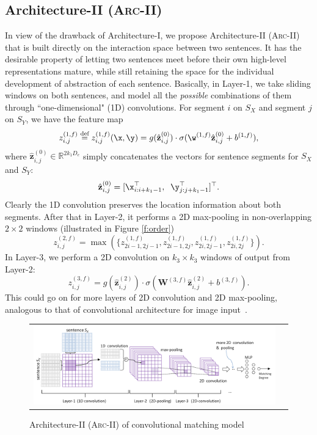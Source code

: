 \documentclass{article} %
\begin{document}
\subsection{Architecture-II (\textsc{Arc-II})}  \vspace{-10pt}
In view of the drawback of Architecture-I, we propose Architecture-II (\textsc{Arc-II}) that is built directly on the interaction space between two sentences. It has the desirable property of letting two sentences meet before their own high-level representations mature, while still retaining the space for the individual development of abstraction of each sentence. Basically, in Layer-1, we take sliding windows on both sentences, and model all the \emph{possible} combinations of them through ``one-dimensional"  (1D) convolutions. For segment $i$ on $S_X$ and segment $j$ on $S_Y$, we have the feature map
\begin{equation}
z^{(1, f)}_{i,j} \overset{\text{def}}{=}
z^{(1,f)}_{i,j}(\x,\y) =  g(\hat{\mathbf{z}}^{(0)}_{i,j})\cdot \sigma(\w^{(1,f)} \hat{\mathbf{z}}^{(0)}_{i,j} + b^{(1,f)}),
\end{equation}
where $\hat{\mathbf{z}}^{(0)}_{i,j} \in \mathbb{R}^{2k_1 D_{e}}$ simply concatenates the vectors for sentence segments for $S_X$ and $S_Y$:
\[
\hat{\mathbf{z}}^{(0)}_{i,j} =  [\x_{i:i+k_1-1}^\top,\;\; \y_{j:j+k_1-1}^\top]^\top.
\]
Clearly the 1D convolution preserves the location information about both segments. After that in Layer-2, it performs a 2D max-pooling in non-overlapping $2\times 2$ windows (illustrated in Figure \ref{f:order})
\begin{equation}
z_{i,j}^{(2,f)} = \max(\{z_{2i-1,2j-1}^{(1,f)}, z_{2i-1,2j}^{(1,f)},z_{2i,2j-1}^{(1,f)},z_{2i,2j}^{(1,f)}\}). \label{e:2dpool}
\end{equation}
In Layer-3, we perform a 2D convolution on $k_3\times k_3$ windows of output from Layer-2:
\begin{equation}
z^{(3, f)}_{i,j} =  g(\hat{\mathbf{z}}^{(2)}_{i,j})\cdot \sigma(\mathbf{W}^{(3,f)} \hat{\mathbf{z}}^{(2)}_{i,j} + b^{(3,f)}).
\end{equation}
This could go on for more layers of 2D convolution and 2D max-pooling, analogous to that of convolutional architecture for image input~\cite{cnn}.

\begin{figure}[h!]
\begin{center}
    \begin{tabular}[c]{cc}
      \includegraphics[width=1\textwidth]{pics/2dCNN_D.png}
\end{tabular}
    \caption{Architecture-II (\textsc{Arc-II}) of convolutional matching model}
    \label{f:2DCNN}
  \end{center} \vspace{-10pt}
\end{figure}
\end{document}
